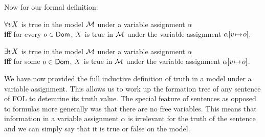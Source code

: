 Now for our formal definition:
\begin{definition}
	$\forall vX$ is true in the model ${\mathcal{M}}$ under a variable assignment $\alpha$\\
	\textbf{iff} for every $o\in \mathsf{Dom}$, $X$ is true in ${\mathcal{M}}$ under the variable assignment $\alpha[v \!\mapsto\! o]$.
	
	\bigskip
	
	$\exists vX$ is true in the model ${\mathcal{M}}$ under a variable assignment $\alpha$\\
	\textbf{iff} for some $o\in \mathsf{Dom}$, $X$ is true in ${\mathcal{M}}$ under the variable assignment $\alpha[v \!\mapsto\! o]$.
\end{definition}


We have now provided the full inductive definition of truth in a model under a variable assignment. This allows us to work up the formation tree of any sentence of FOL to detemrine its truth value. The special feature of sentences as opposed to formulas more generally was that there are no free variables. This means that information in a variable assignment $\alpha$ is irrelevant for the truth of the sentence and we can simply say that it is true or false on the model. 






